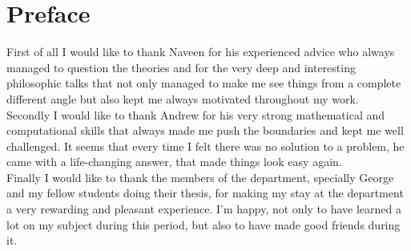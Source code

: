 \section*{Preface}

First of all I would like to thank Naveen for his experienced advice who always managed to question the theories and for the very deep and interesting philosophic talks that not only managed to make me see things from a complete different angle but also kept me always motivated throughout my work.\\

Secondly I would like to thank Andrew for his very strong mathematical and computational skills that always made me push the boundaries and kept me well challenged. It seems that every time I felt there was no solution to a problem, he came with a life-changing answer, that made things look easy again.\\

 Finally I would like to thank the members of the department, specially George and my fellow students doing their thesis, for making my stay at the department a very rewarding and pleasant experience. I'm happy, not only to have learned a lot on my subject during this period, but also to have made good friends during it.